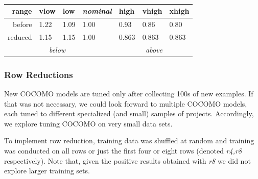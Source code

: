 \documentclass{sig-alternate}
\begin{document}
{\scriptsize   
~~~~~~\begin{tabular}{r|ll|l|lll|}
      range      & vlow&  low&{\em nominal}&high&vhigh&xhigh\\\hline
     before & 1.22& 1.09& 1.00& 0.93& 0.86& 0.80\\
     reduced&1.15& 1.15& 1.00&  0.863& 0.863&0.863\\\cline{2-3}\cline{5-7}
                 & \multicolumn{2}{c|}{{\em below}} &&\multicolumn{3}{c|}{{\em above}}
\end{tabular}
 }
\subsubsection{Row Reductions}\label{sect:row}
New COCOMO models are tuned only after collecting
100s of new examples. If that was not necessary, we could look forward to multiple
COCOMO models, each tuned to different specialized (and small) samples of projects.
Accordingly, we explore tuning COCOMO
on very small data sets.

To implement  row reduction, training data was
shuffled at random and training was conducted on
all rows or  just the first four or eight  rows
(denoted {\em r4,r8} respectively). Note that, given  the positive
results obtained with {\em r8} we did not explore larger training sets.
\end{document}
